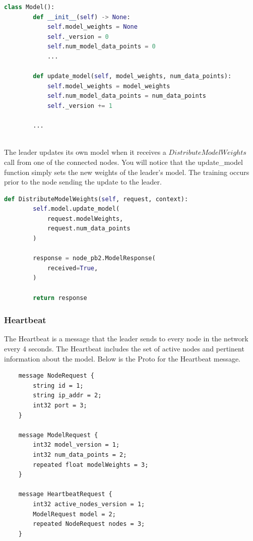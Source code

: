 \documentclass{article}
\begin{document}
\begin{lstlisting}[language=Python]
    class Model():
        def __init__(self) -> None:
            self.model_weights = None
            self._version = 0
            self.num_model_data_points = 0
            ...

        def update_model(self, model_weights, num_data_points):
            self.model_weights = model_weights
            self.num_model_data_points = num_data_points
            self._version += 1

        ...
    
\end{lstlisting}

The leader updates its own model when it receives a $DistributeModelWeights$ call from one of the connected nodes. You will notice that the update\_model function simply sets the new weights of the leader's model. The training occurs prior to the node sending the update to the leader.

\begin{lstlisting}[language=Python]
    def DistributeModelWeights(self, request, context):
        self.model.update_model(
            request.modelWeights, 
            request.num_data_points
        )
    
        response = node_pb2.ModelResponse(
            received=True,
        )
        
        return response
    \end{lstlisting}



\subsubsection{Heartbeat}
\label{sec:hb}
The Heartbeat is a message that the leader sends to every node in the network every 4 seconds. The Heartbeat includes the set of active nodes and pertinent information about the model. Below is the Proto for the Heartbeat message.

\begin{lstlisting}
    message NodeRequest {
        string id = 1;
        string ip_addr = 2;
        int32 port = 3;
    }

    message ModelRequest {
        int32 model_version = 1;
        int32 num_data_points = 2;
        repeated float modelWeights = 3;
    }

    message HeartbeatRequest {
        int32 active_nodes_version = 1;
        ModelRequest model = 2;
        repeated NodeRequest nodes = 3;
    }

\end{lstlisting}
\end{document}

